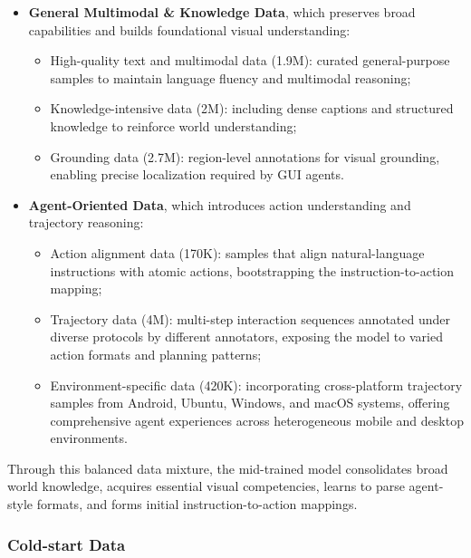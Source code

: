 \begin{itemize}
    \item \textbf{General Multimodal \& Knowledge Data}, which preserves broad capabilities and builds foundational visual understanding:
    \begin{itemize}
        \item High-quality text and multimodal data (1.9M): curated general-purpose samples to maintain language fluency and multimodal reasoning;
        \item Knowledge-intensive data (2M): including dense captions and structured knowledge to reinforce world understanding;
        \item Grounding data (2.7M): region-level annotations for visual grounding, enabling precise localization required by GUI agents.
    \end{itemize}
    
    \item \textbf{Agent-Oriented Data}, which introduces action understanding and trajectory reasoning:
    \begin{itemize}
        \item Action alignment data (170K): samples that align natural-language instructions with atomic actions, bootstrapping the instruction-to-action mapping;
        \item Trajectory data (4M): multi-step interaction sequences annotated under diverse protocols by different annotators, exposing the model to varied action formats and planning patterns;
        \item Environment-specific data (420K): incorporating cross-platform trajectory samples from Android, Ubuntu, Windows, and macOS systems, offering comprehensive agent experiences across heterogeneous mobile and desktop environments.
    \end{itemize}
\end{itemize}
Through this balanced data mixture, the mid-trained model consolidates broad world knowledge, acquires essential visual competencies, learns to parse agent-style formats, and forms initial instruction-to-action mappings.

\subsubsection{Cold-start Data}

